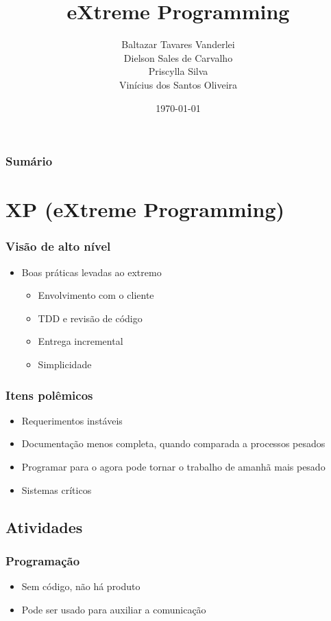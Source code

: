 \documentclass[10pt]{beamer}
\title[]{eXtreme Programming}
\author[]{Baltazar Tavares Vanderlei\\
Dielson Sales de Carvalho\\
Priscylla Silva\\
Vinícius dos Santos Oliveira}
\date{\today}
\institute[2013]{Instituto de Computação - IC/UFAL}
\begin{document}
\newcommand{\til}{\~{}}

\frame{\titlepage}
\begin{frame}[t]
  \frametitle{Sumário}
  \tableofcontents[framebreaks]
\end{frame}




\section{XP (eXtreme Programming)}
\begin{frame}
  \frametitle{Visão de alto nível}
  \begin{itemize}%
  \item Boas práticas levadas ao extremo
    \begin{itemize}
    \item Envolvimento com o cliente
    \item TDD e revisão de código
    \item Entrega incremental
    \item Simplicidade
    \end{itemize}
  \end{itemize}
\end{frame}

\begin{frame}
  \frametitle{Itens polêmicos}
  \begin{itemize}
  \item Requerimentos instáveis
  \item Documentação menos completa, quando comparada a processos pesados
  \item Programar para o agora pode tornar o trabalho de amanhã mais pesado
  \item Sistemas críticos
  \end{itemize}
\end{frame}

\subsection{Atividades}
\begin{frame}
  \frametitle{Programação}
  \begin{itemize}
  \item Sem código, não há produto
  \item Pode ser usado para auxiliar a comunicação
  \end{itemize}
\end{frame}
\end{document}
